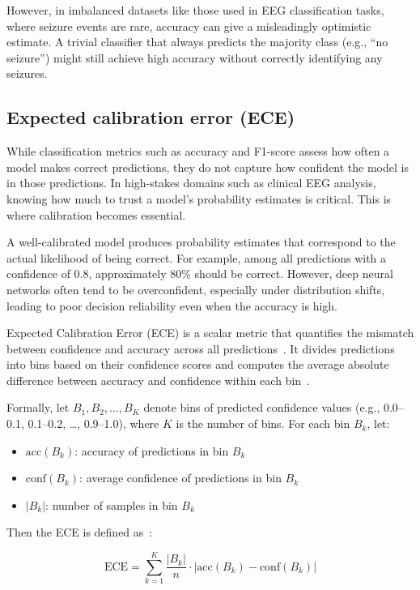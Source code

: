 However, in imbalanced datasets like those used in EEG classification tasks, where seizure events are rare, accuracy can give a misleadingly optimistic estimate. A trivial classifier that always predicts the majority class (e.g., “no seizure”) might still achieve high accuracy without correctly identifying any seizures.

\subsection*{Expected calibration error (ECE)}
While classification metrics such as accuracy and F1-score assess how often a model makes correct predictions, they do not capture how confident the model is in those predictions. In high-stakes domains such as clinical EEG analysis, knowing how much to trust a model’s probability estimates is critical. This is where calibration becomes essential.

A well-calibrated model produces probability estimates that correspond to the actual likelihood of being correct. For example, among all predictions with a confidence of 0.8, approximately 80\% should be correct. However, deep neural networks often tend to be overconfident, especially under distribution shifts, leading to poor decision reliability even when the accuracy is high.

Expected Calibration Error (ECE) is a scalar metric that quantifies the mismatch between confidence and accuracy across all predictions~\cite{calibration1}. It divides predictions into bins based on their confidence scores and computes the average absolute difference between accuracy and confidence within each bin~\cite{ece}.

Formally, let \( B_1, B_2, \ldots, B_K \) denote bins of predicted confidence values (e.g., 0.0--0.1, 0.1--0.2, \ldots, 0.9--1.0), where \( K \) is the number of bins. For each bin \( B_k \), let:
\begin{itemize}
    \item \( \text{acc}(B_k) \): accuracy of predictions in bin \( B_k \)
    \item \( \text{conf}(B_k) \): average confidence of predictions in bin \( B_k \)
    \item \( |B_k| \): number of samples in bin \( B_k \)
\end{itemize}

Then the ECE is defined as~\cite{ece}:

\begin{equation}
\text{ECE} = \sum_{k=1}^{K} \frac{|B_k|}{n} \cdot \left| \text{acc}(B_k) - \text{conf}(B_k) \right|
\end{equation}

